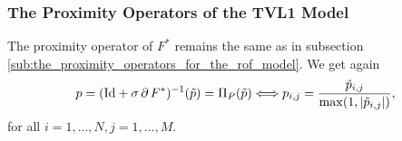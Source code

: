 
    \subsubsection{The Proximity Operators of the TVL1 Model} %
    \label{ssub:the_proximity_operators_of_the_tvl1_model}
        
        The proximity operator of $F^{\ast}$ remains the same as in subsection \ref{sub:the_proximity_operators_for_the_rof_model}. We get again
            \begin{equation}
                p = (\textnormal{Id} + \sigma\,\partial\,F^{\ast})^{-1}(\tilde{p}) = \Pi_{P}(\tilde{p}) \Longleftrightarrow p_{i,j} = \frac{\tilde{p}_{i, j}}{\max(1, |\tilde{p}_{i, j}|)},
            \label{eq:proximity_operator_f_star_tvl1}
            \end{equation}
        for all $i = 1, ..., N, j = 1, ..., M$.

